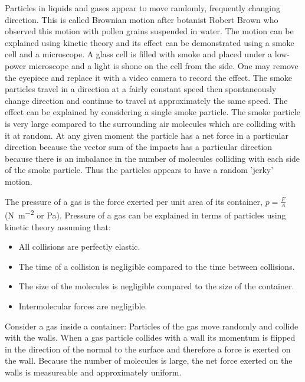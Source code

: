 \documentclass[a4,8pt]{article}
\begin{document}
Particles in liquids and gases appear to move randomly, frequently changing direction. This is called Brownian motion after botanist Robert Brown who observed this motion with pollen grains suspended in water. The motion can be explained using kinetic theory and its effect can be demonstrated using a smoke cell and a microscope. A glass cell is filled with smoke and placed under a low-power microscope and a light is shone on the cell from the side. One may remove the eyepiece and replace it with a video camera to record the effect. The smoke particles travel in a direction at a fairly constant speed then spontaneously change direction and continue to travel at approximately the same speed. The effect can be explained by considering a single smoke particle. The smoke particle is very large compared to the surrounding air molecules which are colliding with it at random. At any given moment the particle has a net force in a particular direction because the vector sum of the impacts has a particular direction because there is an imbalance in the number of molecules colliding with each side of the smoke particle. Thus the particles appears to have a random 'jerky' motion.

The pressure of a gas is the force exerted per unit area of its container, $p=\frac{F}{A}$ (\si{\newton\per\square\meter} or \si{\pascal}). Pressure of a gas can be explained in terms of particles using kinetic theory assuming that:

\begin{itemize}
	\item All collisions are perfectly elastic.
	\item The time of a collision is negligible compared to the time between collisions.
	\item The size of the molecules is negligible compared to the size of the container.
	\item Intermolecular forces are negligible.
\end{itemize}

Consider a gas inside a container: Particles of the gas move randomly and collide with the walls. When a gas particle collides with a wall its momentum is flipped in the direction of the normal to the surface and therefore a force is exerted on the wall. Because the number of molecules is large, the net force exerted on the walls is measureable and approximately uniform.
\end{document}
